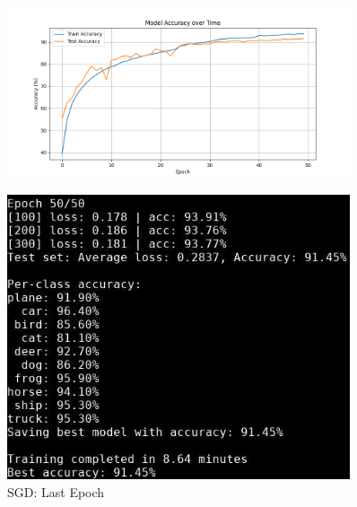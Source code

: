 \begin{frame}
\begin{columns}
    \begin{column}{0.5\textwidth}
        \begin{figure}[t]
            \centering
            \vspace{-0.4cm}
            \includegraphics[width=0.9\textwidth]{media/1stAssignment/cifar10_cnn_sgd_accuracy.png}
        \end{figure}
        \vspace{-0.8cm}
        \begin{figure}[t]
            \centering
            \includegraphics[width=0.9\textwidth]{media/1stAssignment/cnn_sgd_epoch_50.png}
            \vspace{-0.3cm}
            \caption{SGD: Last Epoch}
        \end{figure}
    \end{column}
\end{columns}
\end{frame}

